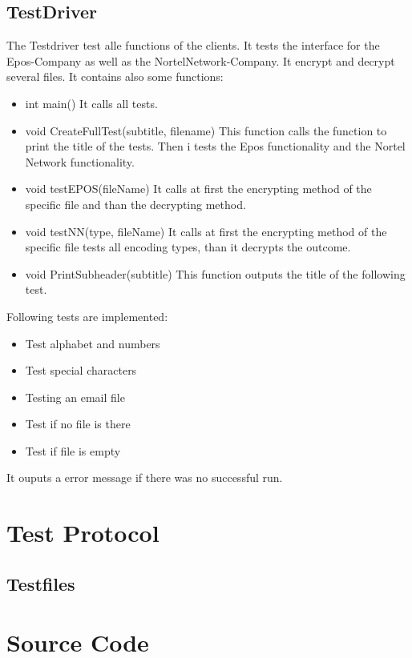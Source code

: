 \subsection{TestDriver}
The Testdriver test alle functions of the clients. It tests the interface for the Epos-Company as well as the NortelNetwork-Company. It encrypt and decrypt several files. It contains also some functions:
\begin{itemize}
\item int main()
\subitem It calls all tests.

\item void CreateFullTest(subtitle, filename)
\subitem This function calls the function to print the title of the tests. Then i tests the Epos functionality and the Nortel Network functionality.

\item void testEPOS(fileName)
\subitem It calls at first the encrypting method of the specific file and than the decrypting method.

\item void testNN(type, fileName)
\subitem It calls at first the encrypting method of the specific file tests all encoding types, than it decrypts the outcome.

\item void PrintSubheader(subtitle)
\subitem This function outputs the title of the following test.
\end{itemize}
Following tests are implemented:
\begin{itemize}
\item Test alphabet and numbers
\item Test special characters
\item Testing an email file
\item Test if no file is there
\item Test if file is empty
\end{itemize}
It ouputs a error message if there was no successful run.

\newpage
\section{Test Protocol}

\subsection{Testfiles}




\newpage
\section{Source Code}


